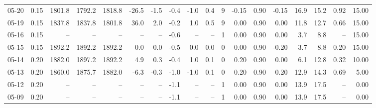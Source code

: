 \begin{threeparttable}
{\begin{tabular}{lrrrrrrrrrrrrrrrrr}
  05-20 &     0.15 & 1801.8 & 1792.2 & 1818.8 &      -26.5 &           -1.5 &                      -0.4 &                     -1.0 &                 0.4 &              9 &      -0.15 &      0.90 &          -0.15 &             16.9 &                15.2 &            0.92 &                  15.00 \\
  05-19 &     0.15 & 1837.8 & 1837.8 & 1801.8 &       36.0 &            2.0 &                      -0.2 &                      1.0 &                 0.5 &              9 &       0.00 &      0.90 &           0.00 &             11.8 &                12.7 &            0.66 &                  15.00 \\
  05-16 &     0.15 &     -- &     -- &     -- &         -- &             -- &                      -0.6 &                       -- &                  -- &              1 &       0.00 &      0.90 &           0.00 &              3.7 &                 8.8 &              -- &                  15.00 \\
  05-15 &     0.15 & 1892.2 & 1892.2 & 1892.2 &        0.0 &            0.0 &                      -0.5 &                      0.0 &                 0.0 &              0 &       0.00 &      0.90 &          -0.20 &              3.7 &                 8.8 &            0.20 &                  15.00 \\
  05-14 &     0.20 & 1882.0 & 1897.2 & 1892.2 &        4.9 &            0.3 &                      -0.4 &                      1.0 &                 0.1 &              0 &       0.20 &      0.90 &           0.00 &              6.1 &                12.8 &            0.32 &                  10.00 \\
  05-13 &     0.20 & 1860.0 & 1875.7 & 1882.0 &       -6.3 &           -0.3 &                      -1.0 &                     -1.0 &                 0.1 &              0 &       0.20 &      0.90 &           0.20 &             12.9 &                14.3 &            0.69 &                   5.00 \\
  05-12 &     0.20 &     -- &     -- &     -- &         -- &             -- &                      -1.1 &                       -- &                  -- &              1 &       0.00 &      0.90 &           0.00 &             13.9 &                17.5 &              -- &                   0.00 \\
  05-09 &     0.20 &     -- &     -- &     -- &         -- &             -- &                      -1.1 &                       -- &                  -- &              1 &       0.00 &      0.90 &           0.00 &             13.9 &                17.5 &              -- &                   0.00 \\

\end{tabular}}
\end{threeparttable}
